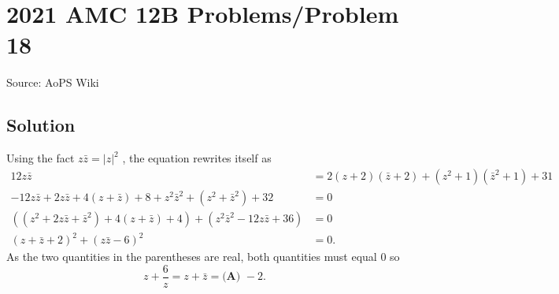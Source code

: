 \documentclass[12pt]{article}
\begin{document}
\section*{{2021 AMC 12B Problems/Problem 18}}
Source: AoPS Wiki

\subsection*{Solution}
Using the fact $z\bar{z}=|z|^2$ , the equation rewrites itself as \begin{align*} 12z\bar{z}&=2(z+2)(\bar{z}+2)+(z^2+1)(\bar{z}^2+1)+31 \\ -12z\bar{z}+2z\bar{z}+4(z+\bar{z})+8+z^2\bar{z}^2+(z^2+\bar{z}^2)+32&=0 \\ \left((z^2+2z\bar{z}+\bar{z}^2)+4(z+\bar{z})+4\right)+\left(z^2\bar{z}^2-12z\bar{z}+36\right)&=0 \\ (z+\bar{z}+2)^2+(z\bar{z}-6)^2&=0. \end{align*} As the two quantities in the parentheses are real, both quantities must equal $0$ so \[z+\frac6z=z+\bar{z}=\boxed{\textbf{(A) }-2}.\]
\end{document}
